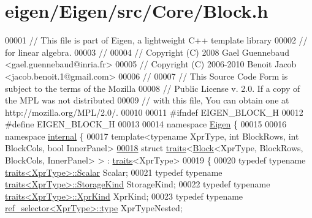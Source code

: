\hypertarget{eigen_2_eigen_2src_2_core_2_block_8h_source}{}\section{eigen/\+Eigen/src/\+Core/\+Block.h}
\label{eigen_2_eigen_2src_2_core_2_block_8h_source}

\begin{DoxyCode}
00001 \textcolor{comment}{// This file is part of Eigen, a lightweight C++ template library}
00002 \textcolor{comment}{// for linear algebra.}
00003 \textcolor{comment}{//}
00004 \textcolor{comment}{// Copyright (C) 2008 Gael Guennebaud <gael.guennebaud@inria.fr>}
00005 \textcolor{comment}{// Copyright (C) 2006-2010 Benoit Jacob <jacob.benoit.1@gmail.com>}
00006 \textcolor{comment}{//}
00007 \textcolor{comment}{// This Source Code Form is subject to the terms of the Mozilla}
00008 \textcolor{comment}{// Public License v. 2.0. If a copy of the MPL was not distributed}
00009 \textcolor{comment}{// with this file, You can obtain one at http://mozilla.org/MPL/2.0/.}
00010 
00011 \textcolor{preprocessor}{#ifndef EIGEN\_BLOCK\_H}
00012 \textcolor{preprocessor}{#define EIGEN\_BLOCK\_H}
00013 
00014 \textcolor{keyword}{namespace }\hyperlink{namespace_eigen}{Eigen} \{ 
00015 
00016 \textcolor{keyword}{namespace }\hyperlink{namespaceinternal}{internal} \{
00017 \textcolor{keyword}{template}<\textcolor{keyword}{typename} XprType, \textcolor{keywordtype}{int} BlockRows, \textcolor{keywordtype}{int} BlockCols, \textcolor{keywordtype}{bool} InnerPanel>
\hyperlink{struct_eigen_1_1internal_1_1traits_3_01_block_3_01_xpr_type_00_01_block_rows_00_01_block_cols_00_01_inner_panel_01_4_01_4}{00018} \textcolor{keyword}{struct }\hyperlink{struct_eigen_1_1internal_1_1traits}{traits}<\hyperlink{group___core___module_class_eigen_1_1_block}{Block}<XprType, BlockRows, BlockCols, InnerPanel> > : 
      \hyperlink{struct_eigen_1_1internal_1_1traits}{traits}<XprType>
00019 \{
00020   \textcolor{keyword}{typedef} \textcolor{keyword}{typename} \hyperlink{struct_eigen_1_1internal_1_1traits}{traits<XprType>::Scalar} Scalar;
00021   \textcolor{keyword}{typedef} \textcolor{keyword}{typename} \hyperlink{struct_eigen_1_1internal_1_1traits}{traits<XprType>::StorageKind} StorageKind;
00022   \textcolor{keyword}{typedef} \textcolor{keyword}{typename} \hyperlink{struct_eigen_1_1internal_1_1traits}{traits<XprType>::XprKind} XprKind;
00023   \textcolor{keyword}{typedef} \textcolor{keyword}{typename} \hyperlink{struct_eigen_1_1internal_1_1ref__selector}{ref\_selector<XprType>::type} XprTypeNested;

\end{DoxyCode}
